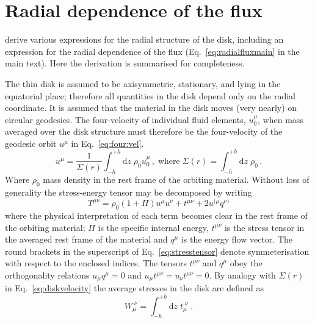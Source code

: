 \clearpage

\section{Radial dependence of the flux}\label{app:b}
\cite{1974ApJ...191..499P} derive various expressions for the radial structure of the disk, including an expression for the radial dependence of the flux (Eq.\ \ref{eq:radialfluxmain} in the main text). Here the derivation is summarised for completeness.

The thin disk is assumed to be axisymmetric, stationary, and lying in the equatorial place; therefore all quantities in the disk depend only on the radial coordinate. It is assumed that the material in the disk moves (very nearly) on circular geodesics. The four-velocity of individual fluid elements, $u^{\mu} _{0}$, when mass averaged over the disk structure must therefore be the four-velocity of the geodesic orbit $u^{\mu}$ in Eq.\ \ref{eq:four:vel}.
\begin{equation}\label{eq:diskvelocity} u^{\mu} = \frac{1}{\Sigma(r)}\int_{-h}^{+h}\textrm{d}z\; \rho_{0} u^{\mu} _{0}  \, ,\;
\textrm{where} \;  \Sigma (r) = \int_{-h}^{+h}\textrm{d}z\;  \rho _{0} \, . \end{equation}
Where $\rho_{0}$ mass density in the rest frame of the orbiting material. Without loss of generality the stress-energy tensor may be decomposed by writing
\begin{equation}\label{eq:stresstensor} T^{\mu \nu} = \rho_{0}\left( 1+\Pi \right)u^{\mu}u^{\nu} + t^{\mu\nu} + 2u^{(\mu}q^{\nu )} \end{equation}
where the physical interpretation of each term becomes clear in the rest frame of the orbiting material; $\Pi$ is the specific internal energy, $t^{\mu\nu}$ is the stress tensor in the averaged rest frame of the material and $q^{\mu}$ is the energy flow vector. The round brackets in the superscript of Eq.\ \ref{eq:stresstensor} denote symmeterisation with respect to the enclosed indices. The tensors $t^{\mu\nu}$ and $q^{\mu}$ obey the orthogonality relations $u_{\mu}q^{\mu}=0$ and $u_{\mu}t^{\mu\nu}=u_{\nu}t^{\mu\nu}=0$. By analogy with $\Sigma(r)$ in Eq.\ \ref{eq:diskvelocity} the average stresses in the disk are defined as
\begin{equation} W_{\mu}^{\; \nu} = \int_{-h}^{+h}\textrm{d}z\; t_{\mu}^{\; \nu}  \; . \end{equation}

